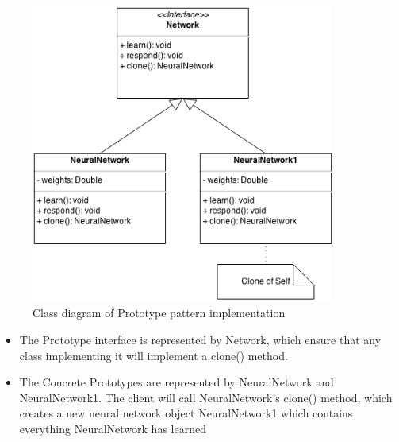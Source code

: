 \documentclass[12pt]{article}
\begin{document}
\begin{figure}[!htb]
  \begin{center}
    \includegraphics[width=100mm]{Prototype.png}
    \caption{Class diagram of Prototype pattern implementation}
    \label{fig:prototype}
  \end{center} 
\end{figure}

\begin{itemize}
\item The Prototype interface is represented by {\ttfamily Network}, which 
  ensure that any class implementing it will implement a {\ttfamily clone()} 
  method.
\item The Concrete Prototypes are represented by {\ttfamily NeuralNetwork} and
  {\ttfamily NeuralNetwork1}. The client will call {\ttfamily NeuralNetwork}'s 
  {\ttfamily clone()} method, which creates a new neural network object
  {\ttfamily NeuralNetwork1} which contains everything {\ttfamily NeuralNetwork}
  has learned
\end{itemize}
\end{document}
